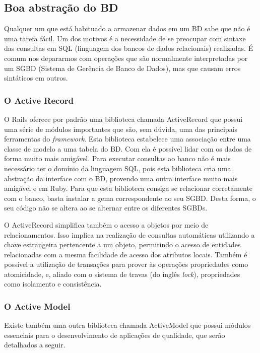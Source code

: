 \subsection{Boa abstração do BD}

Qualquer um que está habituado a armazenar dados em um BD sabe que não é uma tarefa fácil. Um dos motivos é a necessidade de se preocupar com sintaxe das consultas em SQL (linguagem dos bancos de dados relacionais) realizadas. É comum nos depararmos com operações que são normalmente interpretadas por um SGBD (Sistema de Gerência de Banco de Dados),
mas que causam erros sintáticos em outros.

\subsubsection{O Active Record}

O Rails oferece por padrão uma biblioteca chamada ActiveRecord que possui uma série de módulos importantes que são, sem dúvida, uma das principais ferramentas do \textit{framework}. Esta biblioteca estabelece uma associação entre uma classe de modelo a uma tabela do BD. Com ela é possível lidar com os dados de forma muito mais amigável. Para executar consultas ao banco não é mais necessário ter o domínio da linguagem SQL, pois esta biblioteca cria uma abstração da interface com o BD, provendo uma outra interface muito mais amigável e em Ruby. Para que esta biblioteca consiga se relacionar corretamente com o banco, basta instalar a gema correspondente ao seu SGBD. Desta forma, o seu código não se altera ao se alternar entre os diferentes SGBDs.

O ActiveRecord simplifica também o acesso a objetos por meio de relacionamentos. Isso implica na realização de consultas automáticas utilizando a chave estrangeira pertencente a um objeto, permitindo o acesso de entidades relacionadas com a mesma facilidade de acesso dos atributos locais. Também é possível a utilização de transações para prover às operações propriedades como atomicidade, e, aliado com o sistema de travas (do inglês \textit{lock}), propriedades como isolamento e consistência.

\subsubsection{O Active Model}

Existe também uma outra biblioteca chamada ActiveModel que possui módulos essenciais para o desenvolvimento de aplicações de qualidade, que serão detalhados a seguir.

